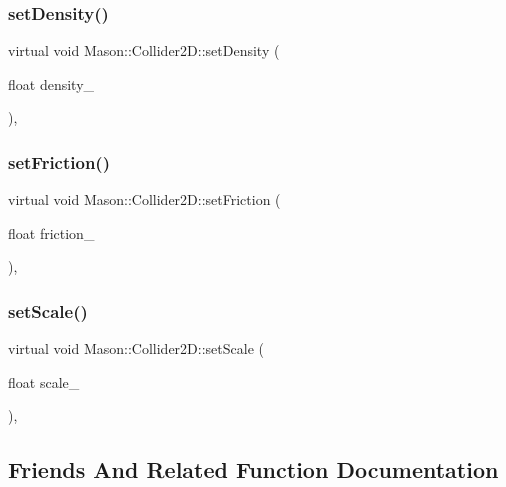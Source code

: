 \subsubsection{\texorpdfstring{set\+Density()}{setDensity()}}
{\footnotesize\ttfamily virtual void Mason\+::\+Collider2\+D\+::set\+Density (\begin{DoxyParamCaption}\item[{float}]{density\+\_\+ }\end{DoxyParamCaption})\hspace{0.3cm}{\ttfamily [inline]}, {\ttfamily [virtual]}}

\hypertarget{class_mason_1_1_collider2_d_aa2e1d4505ee65f9a6fa7490bc50bd092}{}\label{class_mason_1_1_collider2_d_aa2e1d4505ee65f9a6fa7490bc50bd092} 
\subsubsection{\texorpdfstring{set\+Friction()}{setFriction()}}
{\footnotesize\ttfamily virtual void Mason\+::\+Collider2\+D\+::set\+Friction (\begin{DoxyParamCaption}\item[{float}]{friction\+\_\+ }\end{DoxyParamCaption})\hspace{0.3cm}{\ttfamily [inline]}, {\ttfamily [virtual]}}

\hypertarget{class_mason_1_1_collider2_d_a08f3b34369aaa53d89c2d16b37319795}{}\label{class_mason_1_1_collider2_d_a08f3b34369aaa53d89c2d16b37319795} 
\subsubsection{\texorpdfstring{set\+Scale()}{setScale()}}
{\footnotesize\ttfamily virtual void Mason\+::\+Collider2\+D\+::set\+Scale (\begin{DoxyParamCaption}\item[{float}]{scale\+\_\+ }\end{DoxyParamCaption})\hspace{0.3cm}{\ttfamily [inline]}, {\ttfamily [virtual]}}



\subsection{Friends And Related Function Documentation}
\hypertarget{class_mason_1_1_collider2_d_a00df87c957d8f7ee0fc51f07a0542f4a}{}\label{class_mason_1_1_collider2_d_a00df87c957d8f7ee0fc51f07a0542f4a} 
